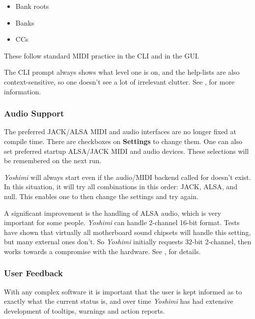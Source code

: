 \documentclass[
 11pt,
 twoside,
 a4paper,
 final                                 %
]{article}
\begin{document}
    \begin{itemize}
       \item Bank roots
       \item Banks
       \item CCs
       \end{itemize}

   These follow standard MIDI practice in the CLI and in the GUI.

   The CLI prompt always
   shows what level one is on, and the help-lists are also
   context-sensitive, so one doesn't see a lot of irrelevant clutter.
   See , for more information.

\subsubsection{Audio Support}
\label{subsubsec:new_features_audio_support}

   The preferred JACK/ALSA MIDI and audio interfaces are no longer fixed at
   compile time. There are checkboxes on \textbf{Settings} to change them.
   One can also set preferred startup ALSA/JACK MIDI and audio devices.
   These selections will be remembered on the next run.

   \textsl{Yoshimi} will always start even if the audio/MIDI backend called
   for doesn't exist. In this situation, it will try all combinations in this
   order: JACK, ALSA, and null. This enables one to then change the settings
   and try again.

   A significant improvement is the handling of ALSA audio, which is very
   important for some people.  \textsl{Yoshimi} can handle 2-channel 16-bit
   format. Tests have shown that virtually all motherboard sound chipsets will
   handle this setting, but many external ones don't.  So \textsl{Yoshimi}
   initially requests 32-bit 2-channel, then works towards a compromise with the
   hardware.
   See , for details.

\subsubsection{User Feedback}
\label{subsubsec:new_features_user_feedback}
   With any complex software it is important that the user is kept informed
   as to exactly what the current status is, and over time \textsl{Yoshimi}
   has had extensive development of tooltips, warnings and action reports.
\end{document}
